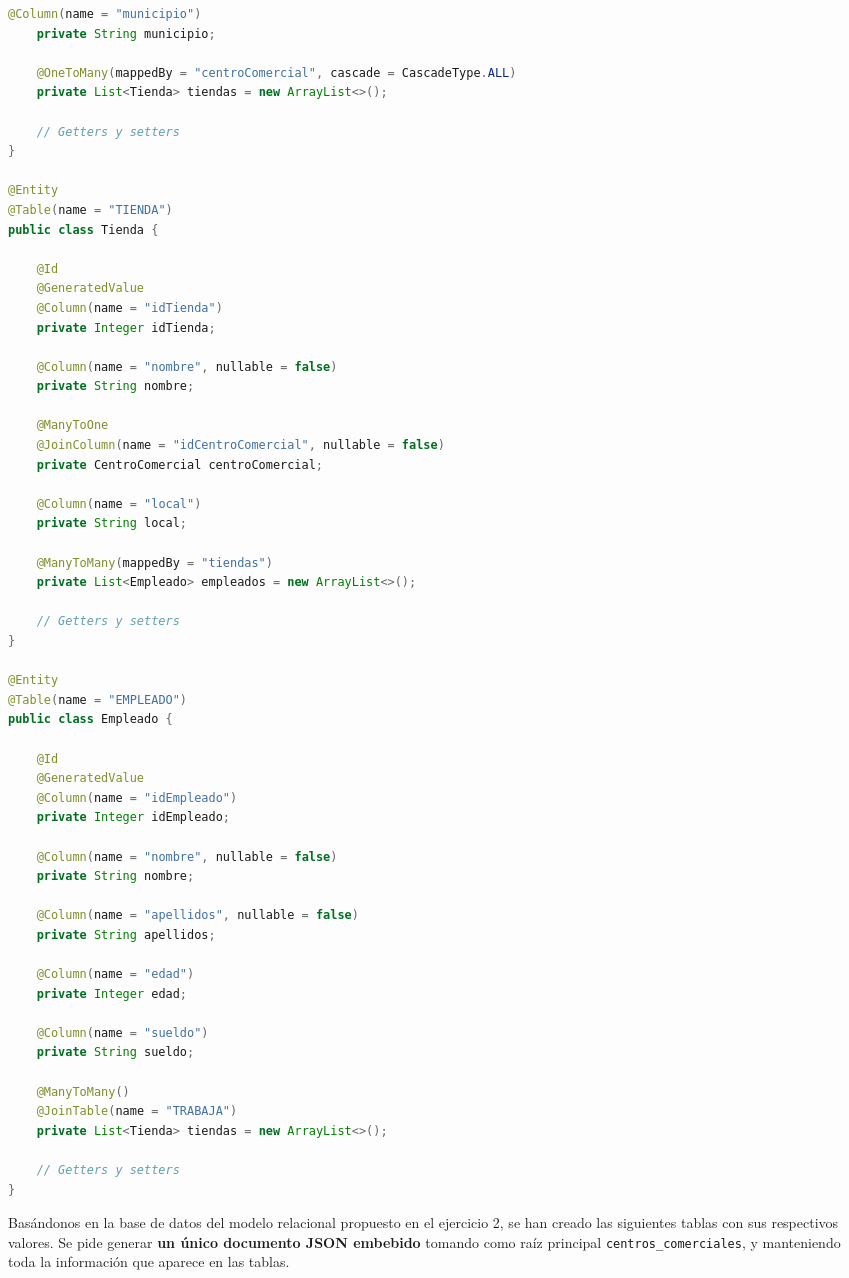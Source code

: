 \documentclass[
    12pt,
    a4paper,
    addpoints,
    answers,
    convocatoria=ord,
    titulacion=NoCD,
    curso=2024/2025,
]{db-exam}
\begin{document}
\begin{questions}
\begin{solution}
\begin{lstlisting}[language=Java]
    @Column(name = "municipio")
    private String municipio;

    @OneToMany(mappedBy = "centroComercial", cascade = CascadeType.ALL)
    private List<Tienda> tiendas = new ArrayList<>();

    // Getters y setters
}

@Entity
@Table(name = "TIENDA")
public class Tienda {

    @Id
    @GeneratedValue
    @Column(name = "idTienda")
    private Integer idTienda;

    @Column(name = "nombre", nullable = false)
    private String nombre;

    @ManyToOne
    @JoinColumn(name = "idCentroComercial", nullable = false)
    private CentroComercial centroComercial;

    @Column(name = "local")
    private String local;

    @ManyToMany(mappedBy = "tiendas")
    private List<Empleado> empleados = new ArrayList<>();

    // Getters y setters
}

@Entity
@Table(name = "EMPLEADO")
public class Empleado {

    @Id
    @GeneratedValue
    @Column(name = "idEmpleado")
    private Integer idEmpleado;

    @Column(name = "nombre", nullable = false)
    private String nombre;

    @Column(name = "apellidos", nullable = false)
    private String apellidos;

    @Column(name = "edad")
    private Integer edad;

    @Column(name = "sueldo")
    private String sueldo;

    @ManyToMany()
    @JoinTable(name = "TRABAJA")
    private List<Tienda> tiendas = new ArrayList<>();

    // Getters y setters
}
\end{lstlisting}       
\end{solution}

\newpage
\question[\half] Basándonos en la base de datos del modelo relacional propuesto en el ejercicio 2, se han creado las siguientes tablas con sus respectivos valores. Se pide generar \textbf{un único documento JSON embebido} tomando como raíz principal \texttt{centros\_comerciales}, y manteniendo toda la información que aparece en las tablas.

\begin{table}[h!]
\centering
\small
\begin{tabular}{|p{4cm}|p{2.5cm}|p{2.5cm}|p{2cm}|p{2.5cm}|}


\end{tabular}
\end{table}
\end{questions}
\end{document}
